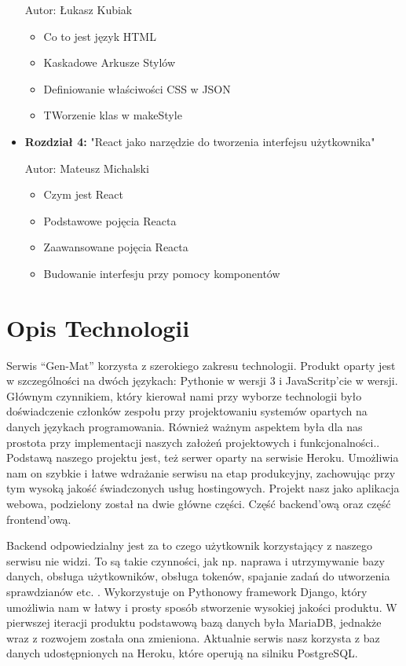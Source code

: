 \documentclass[oneside,polski,logo,indent]{amuthesis}
\begin{document}
\begin{itemize}
Autor: Łukasz Kubiak
\begin{itemize}
\item Co to jest język HTML
\item Kaskadowe Arkusze Stylów
\item Definiowanie właściwości CSS w JSON
\item TWorzenie klas w makeStyle
\end{itemize}
\item \textbf{Rozdział 4:} "React jako narzędzie do tworzenia interfejsu użytkownika"

Autor: Mateusz Michalski
\begin{itemize}
\item Czym jest React
\item Podstawowe pojęcia Reacta
\item Zaawansowane pojęcia Reacta
\item Budowanie interfesju przy pomocy komponentów
\end{itemize}
\end{itemize}
\section{Opis Technologii}
Serwis “Gen-Mat” korzysta z szerokiego zakresu technologii. Produkt oparty jest w szczególności na dwóch językach: Pythonie w wersji 3 i JavaScritp'cie w wersji. Głównym czynnikiem, który kierował nami przy wyborze technologii było doświadczenie członków zespołu przy projektowaniu systemów opartych na danych językach programowania. Również ważnym aspektem była dla nas prostota przy implementacji naszych założeń projektowych i funkcjonalności.. Podstawą naszego projektu jest, też serwer oparty na serwisie Heroku. Umożliwia nam on szybkie i łatwe wdrażanie serwisu na etap produkcyjny, zachowując przy tym wysoką jakość świadczonych usług hostingowych. Projekt nasz jako aplikacja webowa, podzielony został na dwie główne części. Część backend’ową oraz część frontend’ową.  

Backend odpowiedzialny jest za to czego użytkownik korzystający z naszego serwisu nie widzi. To są takie czynności, jak np. naprawa i utrzymywanie bazy danych, obsługa użytkowników, obsługa tokenów, spajanie zadań do utworzenia sprawdzianów etc. . Wykorzystuje on Pythonowy framework Django, który umożliwia nam w łatwy i prosty sposób stworzenie wysokiej jakości produktu. W pierwszej iteracji produktu podstawową bazą danych była MariaDB, jednakże wraz z rozwojem została ona zmieniona. Aktualnie serwis nasz korzysta z baz danych udostępnionych na Heroku, które operują na silniku PostgreSQL.   
\end{document}
